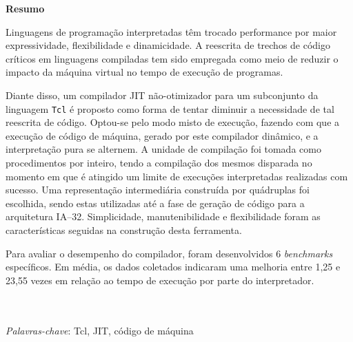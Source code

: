
{
\Large
\begin{center}
\textbf{Resumo}
\end{center}
}

Linguagens de programação interpretadas têm trocado performance por
maior expressividade, flexibilidade e dinamicidade. A reescrita de
trechos de código críticos em linguagens compiladas tem sido empregada
como meio de reduzir o impacto da máquina virtual no tempo de execução
de programas.

Diante disso, um compilador JIT não-otimizador para um subconjunto
da linguagem \texttt{Tcl} é proposto como forma de tentar diminuir a
necessidade de tal reescrita de código. Optou-se pelo modo misto de
execução, fazendo com que a execução de código de máquina, gerado por
este compilador dinâmico, e a interpretação pura se alternem. A
unidade de compilação foi tomada como procedimentos por inteiro, tendo
a compilação dos mesmos disparada no momento em que é atingido um
limite de execuções interpretadas realizadas com
sucesso. Uma representação intermediária construída por quádruplas foi
escolhida, sendo estas utilizadas até a fase de geração de código para
a arquitetura IA--32. Simplicidade, manutenibilidade e flexibilidade
foram as características seguidas na construção desta ferramenta.

Para avaliar o desempenho do compilador, foram desenvolvidos 6
\textit{benchmarks} específicos. Em média, os dados coletados
indicaram uma melhoria entre 1,25 e 23,55 vezes em relação ao tempo de
execução por parte do interpretador.%

\quad\\
\quad\\
\textit{Palavras-chave}: Tcl, JIT, código de máquina

\pagebreak

